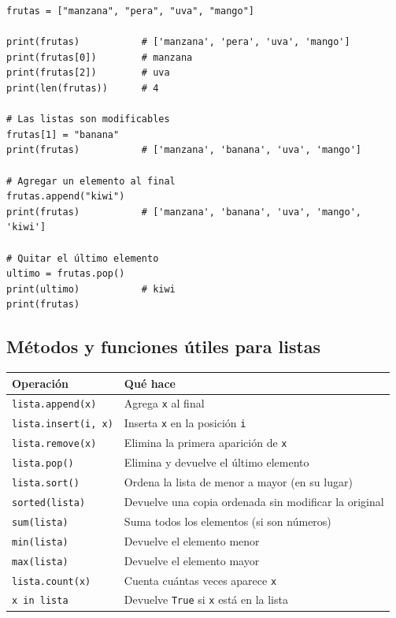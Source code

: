 \documentclass[11pt,a4paper]{article}
\begin{document}
\begin{cajaEjemplo}
\begin{lstlisting}[style=pythonStyle, caption={Creando y usando listas}]
frutas = ["manzana", "pera", "uva", "mango"]

print(frutas)           # ['manzana', 'pera', 'uva', 'mango']
print(frutas[0])        # manzana
print(frutas[2])        # uva
print(len(frutas))      # 4

# Las listas son modificables
frutas[1] = "banana"
print(frutas)           # ['manzana', 'banana', 'uva', 'mango']

# Agregar un elemento al final
frutas.append("kiwi")
print(frutas)           # ['manzana', 'banana', 'uva', 'mango', 'kiwi']

# Quitar el último elemento
ultimo = frutas.pop()
print(ultimo)           # kiwi
print(frutas)
\end{lstlisting}
\end{cajaEjemplo}

\subsection{Métodos y funciones útiles para listas}

\begin{table}[h]
\centering
\begin{tabularx}{\textwidth}{l X}
\toprule
\textbf{Operación} & \textbf{Qué hace} \\
\midrule
\texttt{lista.append(x)} & Agrega \texttt{x} al final \\
\texttt{lista.insert(i, x)} & Inserta \texttt{x} en la posición \texttt{i} \\
\texttt{lista.remove(x)} & Elimina la primera aparición de \texttt{x} \\
\texttt{lista.pop()} & Elimina y devuelve el último elemento \\
\texttt{lista.sort()} & Ordena la lista de menor a mayor (en su lugar) \\
\texttt{sorted(lista)} & Devuelve una copia ordenada sin modificar la original \\
\texttt{sum(lista)} & Suma todos los elementos (si son números) \\
\texttt{min(lista)} & Devuelve el elemento menor \\
\texttt{max(lista)} & Devuelve el elemento mayor \\
\texttt{lista.count(x)} & Cuenta cuántas veces aparece \texttt{x} \\
\texttt{x in lista} & Devuelve \texttt{True} si \texttt{x} está en la lista \\
\bottomrule
\end{tabularx}
\end{table}
\end{document}
